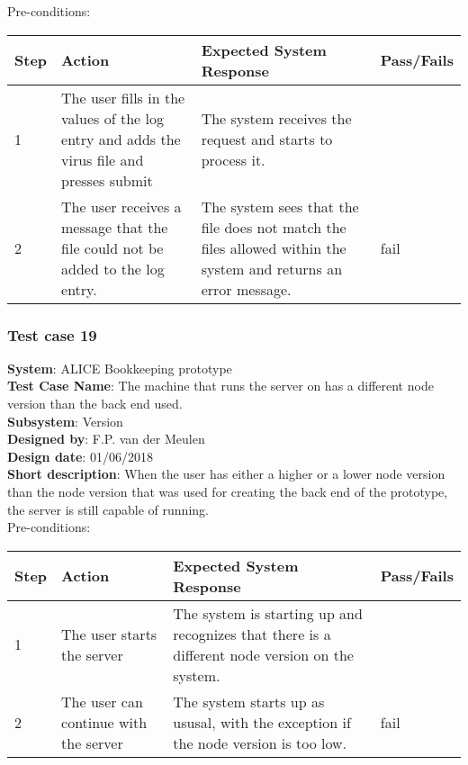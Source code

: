 Pre-conditions: \\

\begin{longtable}{ | p{0.8cm} | p{4.5cm} | p{6cm} | p{1.5cm} |}
\hline
Step & Action & Expected System Response & Pass/Fails  \\ \hline
1 & The user fills in the values of the log entry and adds the virus file and presses submit & The system receives the request and starts to process it. &  \\ \hline
2 & The user receives a message that the file could not be added to the log entry. & The system sees that the file does not match the files allowed within the system and returns an error message. & fail\\ \hline
 
\end{longtable}
\subsubsection{Test case 19}
\textbf{System}:  ALICE Bookkeeping prototype \\
\textbf{Test Case Name}:  The machine that runs the server on has a different node version than the back end used.  \\
\textbf{Subsystem}:  Version \\
\textbf{Designed by}:  F.P. van der Meulen\\
\textbf{Design date}:  01/06/2018\\
\textbf{Short description}: When the user has either a higher or a lower node version than the node version that was used for creating the back end of the prototype, the server is still capable of running. \\

Pre-conditions: \\

\begin{longtable}{ | p{0.8cm} | p{4.5cm} | p{6cm} | p{1.5cm} |}
\hline
Step & Action & Expected System Response & Pass/Fails  \\ \hline
1 & The user starts the server & The system is starting up and recognizes that there is a different node version on the system. &  \\ \hline
2 & The user can continue with the server & The system starts up as ususal, with the exception if the node version is too low. & fail\\ \hline
 
\end{longtable}
